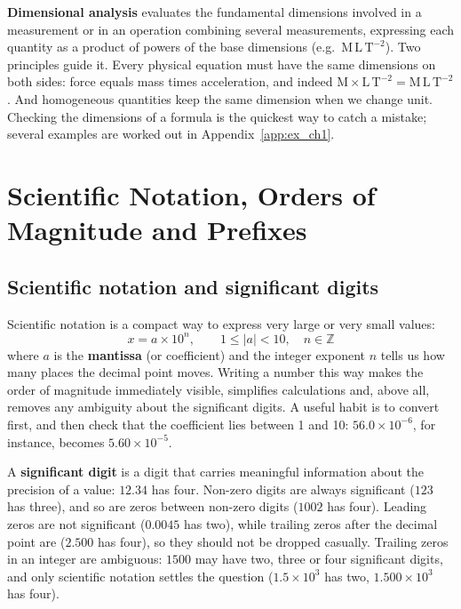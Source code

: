 \documentclass[letterpaper,11pt,leqno]{book}
\begin{document}
\textbf{Dimensional analysis} evaluates the fundamental dimensions involved in a measurement or in an operation combining several measurements, expressing each quantity as a product of powers of the base dimensions (e.g.\ $\text{M}\,\text{L}\,\text{T}^{-2}$). Two principles guide it. Every physical equation must have the same dimensions on both sides: force equals mass times acceleration, and indeed $\text{M} \times \text{L}\,\text{T}^{-2} = \text{M}\,\text{L}\,\text{T}^{-2}$. And homogeneous quantities keep the same dimension when we change unit. Checking the dimensions of a formula is the quickest way to catch a mistake; several examples are worked out in Appendix~\ref{app:ex_ch1}.

\section{Scientific Notation, Orders of Magnitude and Prefixes}
\label{sec:notation}

\subsection{Scientific notation and significant digits}

Scientific notation is a compact way to express very large or very small values:
\begin{equation}
\boxed{x = a \times 10^n, \qquad 1 \le |a| < 10, \quad n \in \mathbb{Z}}
\label{eq:scientific_notation_def}
\end{equation}
where $a$ is the \textbf{mantissa} (or coefficient) and the integer exponent $n$ tells us how many places the decimal point moves. Writing a number this way makes the order of magnitude immediately visible, simplifies calculations and, above all, removes any ambiguity about the significant digits. A useful habit is to convert first, and then check that the coefficient lies between 1 and 10: $56.0 \times 10^{-6}$, for instance, becomes $5.60 \times 10^{-5}$.

A \textbf{significant digit} is a digit that carries meaningful information about the precision of a value: $12.34$ has four. Non-zero digits are always significant ($123$ has three), and so are zeros between non-zero digits ($1002$ has four). Leading zeros are not significant ($0.0045$ has two), while trailing zeros after the decimal point are ($2.500$ has four), so they should not be dropped casually. Trailing zeros in an integer are ambiguous: $1500$ may have two, three or four significant digits, and only scientific notation settles the question ($1.5 \times 10^3$ has two, $1.500 \times 10^3$ has four).
\end{document}
